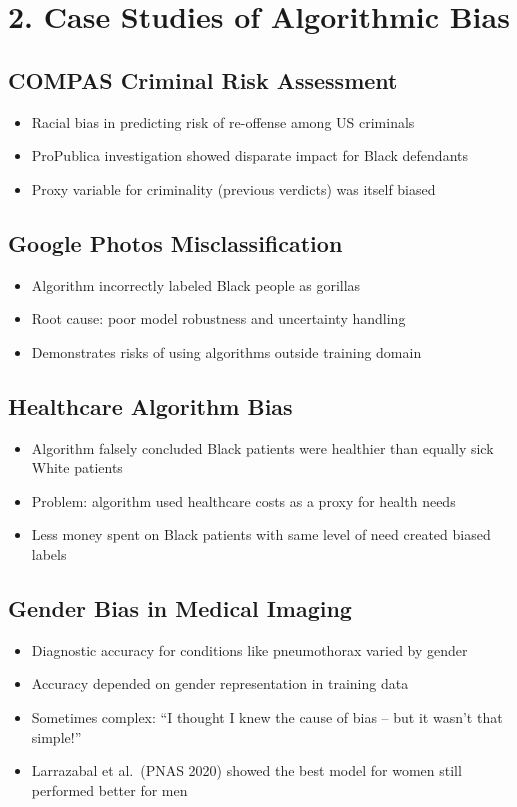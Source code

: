 \section*{2. Case Studies of Algorithmic Bias}

\subsection*{COMPAS Criminal Risk Assessment}
\begin{itemize}
    \item Racial bias in predicting risk of re-offense among US criminals
    \item ProPublica investigation showed disparate impact for Black defendants
    \item Proxy variable for criminality (previous verdicts) was itself biased
\end{itemize}

\subsection*{Google Photos Misclassification}
\begin{itemize}
    \item Algorithm incorrectly labeled Black people as gorillas
    \item Root cause: poor model robustness and uncertainty handling
    \item Demonstrates risks of using algorithms outside training domain
\end{itemize}

\subsection*{Healthcare Algorithm Bias}
\begin{itemize}
    \item Algorithm falsely concluded Black patients were healthier than equally sick White patients
    \item Problem: algorithm used healthcare costs as a proxy for health needs
    \item Less money spent on Black patients with same level of need created biased labels
\end{itemize}

\subsection*{Gender Bias in Medical Imaging}
\begin{itemize}
    \item Diagnostic accuracy for conditions like pneumothorax varied by gender
    \item Accuracy depended on gender representation in training data
    \item Sometimes complex: ``I thought I knew the cause of bias -- but it wasn't that simple!''
    \item Larrazabal et al.\ (PNAS 2020) showed the best model for women still performed better for men
\end{itemize}

